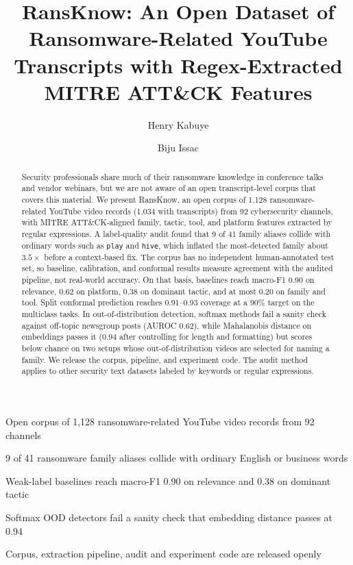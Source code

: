 \documentclass[preprint,12pt]{elsarticle}
\begin{document}
\begin{frontmatter}

\title{RansKnow: An Open Dataset of Ransomware-Related YouTube
Transcripts with Regex-Extracted MITRE ATT\&CK Features}

\author[nu]{Henry Kabuye}
\author[nu]{Biju Issac}



\begin{abstract}
Security professionals share much of their ransomware knowledge in
conference talks and vendor webinars, but we are not aware of an open
transcript-level corpus that covers this material. We present RansKnow,
an open corpus of 1{,}128 ransomware-related YouTube video records
(1{,}034 with transcripts) from 92 cybersecurity channels, with MITRE
ATT\&CK-aligned family, tactic, tool, and platform features extracted by
regular expressions. A label-quality audit found that 9 of 41 family
aliases collide with ordinary words such as \texttt{play} and
\texttt{hive}, which inflated the most-detected family about $3.5\times$
before a context-based fix. The corpus has no independent human-annotated
test set, so baseline, calibration, and conformal results measure
agreement with the audited pipeline, not real-world accuracy. On that
basis, baselines reach macro-F1 0.90 on relevance, 0.62 on platform, 0.38
on dominant tactic, and at most 0.20 on family and tool. Split conformal
prediction reaches 0.91--0.93 coverage at a 90\% target on the multiclass
tasks. In out-of-distribution detection, softmax methods fail a sanity
check against off-topic newsgroup posts (AUROC 0.62), while Mahalanobis
distance on embeddings passes it (0.94 after controlling for length and
formatting) but scores below chance on two
setups whose out-of-distribution videos are selected for naming a family.
We release the corpus, pipeline, and experiment code. The audit method
applies to other security text datasets labeled by keywords or regular
expressions.
\end{abstract}

\begin{highlights}
\item Open corpus of 1,128 ransomware-related YouTube video records from 92 channels
\item 9 of 41 ransomware family aliases collide with ordinary English or business words
\item Weak-label baselines reach macro-F1 0.90 on relevance and 0.38 on dominant tactic
\item Softmax OOD detectors fail a sanity check that embedding distance passes at 0.94
\item Corpus, extraction pipeline, audit and experiment code are released openly
\end{highlights}


\end{frontmatter}
\end{document}
